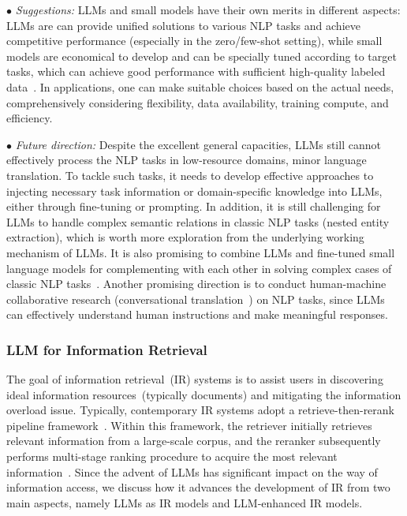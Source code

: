 $\bullet$ \emph{Suggestions:}
LLMs and small models have their own merits in different aspects: LLMs are can provide unified solutions to various NLP tasks and achieve competitive performance (especially in the zero/few-shot setting), while small models are economical to develop and can be specially tuned according to target tasks, which can achieve good performance with sufficient high-quality labeled data~\cite{Qin-arxiv-2023-Is,Chen-arxiv-2023-Robust,Kocon-arxiv-2023-ChatGPT,Zhong-arxiv-2023-Can}.  
In applications, one can make suitable choices based on the actual needs, comprehensively considering flexibility, data availability, training compute, and efficiency.


$\bullet$ \emph{Future direction:} 
{%
{Despite the excellent general capacities, LLMs still cannot effectively process the NLP tasks in low-resource domains, \eg minor language translation. 
To tackle such tasks, it needs to develop effective approaches to injecting necessary task information or domain-specific knowledge into LLMs, either through fine-tuning or prompting. %
In addition, it is still challenging for LLMs to handle complex semantic relations in classic NLP tasks (\eg nested entity extraction), which is worth more exploration from the underlying working mechanism of LLMs. 
}
It is also promising to combine LLMs and fine-tuned small language models for complementing with each other in solving complex cases of classic NLP tasks~\cite{Cheng-arxiv-2023-UPRISE}. 
Another promising direction is to conduct human-machine collaborative research (\eg conversational translation~\cite{jiao-arxiv-2023-parrot}) on NLP tasks, since LLMs can effectively understand human instructions and make meaningful responses. 
}

\subsubsection{LLM for Information Retrieval}
{
The goal of information retrieval~(IR) systems is to assist users in discovering ideal information resources~(typically documents) and mitigating the information overload issue.
Typically, contemporary IR systems adopt a  retrieve-then-rerank pipeline framework~\cite{Zhao-arxiv-2022-Dense}. Within this framework, the retriever initially retrieves relevant information from a large-scale corpus, and the reranker subsequently performs multi-stage  ranking procedure to acquire the most relevant information~\cite{Ren-EMNLP-2021-rocketqav2}.
Since the advent of LLMs has significant impact on the way of information access, we discuss how it advances the development of IR from two main aspects, namely LLMs as IR models and LLM-enhanced IR models.   
}

